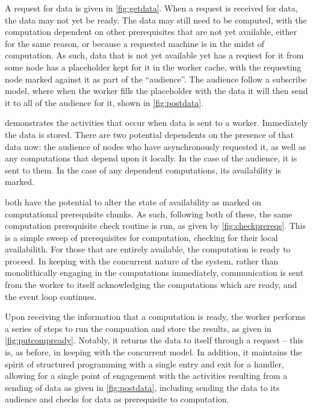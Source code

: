 
A request for data is given in \cref{fig:getdata}.
When a request is received for data, the data may not yet be ready.
The data may still need to be computed, with the computation dependent on other prerequisites that are not yet available, either for the same reason, or because a requested machine is in the midst of computation.
As such, data that is not yet available yet has a request for it from some node has a placeholder kept for it in the worker cache, with the requesting node marked against it as part of the ``audience''.
The audience follow a subscribe model, where when the worker fills the placeholder with the data it will then send it to all of the audience for it, shown in \cref{fig:postdata}.


 demonstrates the activities that occur when data is sent to a worker.
Immediately the data is stored.
There are two potential dependents on the presence of that data now: the audience of nodes who have asynchronously requested it, as well as any computations that depend upon it locally.
In the case of the audience, it is sent to them.
In the case of any dependent computations, its availability is marked.


 both have the potential to alter the state of availability as marked on computational prerequisite chunks.
As such, following both of these, the same computation prerequisite check routine is run, as given by \cref{fig:checkprereqs}.
This is a simple sweep of prerequisites for computation, checking for their local availabilith.
For those that are entirely available, the computation is ready to proceed.
In keeping with the concurrent nature of the system, rather than monolithically engaging in the computations immediately, communication is sent from the worker to itself acknowledging the computations which are ready, and the event loop continues.


Upon receiving the information that a computation is ready, the worker performs a series of steps to run the compuation and store the results, as given in \cref{fig:putcompready}.
Notably, it returns the data to itself through a request -- this is, as before, in keeping with the concurrent model.
In addition, it maintains the spirit of structured programming with a single entry and exit for a handler, allowing for a single point of engagement with the activities resulting from a sending of data as given in \cref{fig:postdata}, including sending the data to its audience and checks for data as prerequisite to computation.

